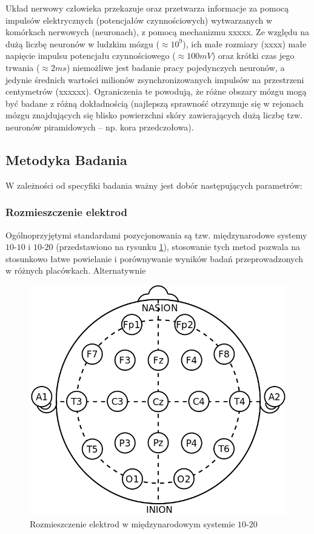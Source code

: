 \documentclass{./assets/wfis}
\begin{document}
Układ nerwowy człowieka przekazuje oraz przetwarza informacje za pomocą impulsów elektrycznych (potencjałów czynnościowych) wytwarzanych w komórkach nerwowych (neuronach), z pomocą mechanizmu xxxxx. Ze względu na dużą liczbę neuronów w ludzkim mózgu ($\approx10^9$\cite{herculano-houzel_human_2009}), ich małe rozmiary (xxxx) małe napięcie impulsu potencjału czynnościowego ($\approx100mV$\cite{biga_anatomy_2019}) oraz krótki czas jego trwania ($\approx2ms$\cite{biga_anatomy_2019}) niemożliwe jest badanie pracy pojedynczych neuronów, a jedynie średnich wartości milionów zsynchronizowanych impulsów na przestrzeni centymetrów (xxxxxx). Ograniczenia te powodują, że różne obszary mózgu mogą być badane z różną dokładnością (najlepszą sprawność otrzymuje się w rejonach mózgu znajdujących się blisko powierzchni skóry zawierających dużą liczbę tzw. neuronów piramidowych – np. kora przedczołowa).

\subsection{Metodyka Badania}

W zależności od specyfiki badania ważny jest dobór następujących parametrów:

\subsubsection{Rozmieszczenie elektrod}
Ogólnoprzyjętymi standardami pozycjonowania są tzw. międzynarodowe systemy $10$-$10$ i $10$-$20$ (przedstawiono na rysunku \ref{fig:10-20-system}), stosowanie tych metod pozwala na stosunkowo łatwe powielanie i porównywanie wyników badań przeprowadzonych w różnych placówkach. Alternatywnie 

\begin{figure}[h]
    \centering
    \includegraphics[width=0.5\columnwidth]{thesis/assets/10-20_system_electrodes.png}
    \caption{Rozmieszczenie elektrod w międzynarodowym systemie $10$-$20$}
    \label{fig:10-20-system}
\end{figure}
\end{document}

